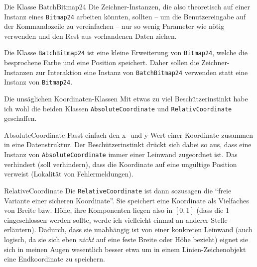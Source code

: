 \begin{frame}[fragile]{Die Klasse BatchBitmap24}
	Die Zeichner-Instanzen, die also theoretisch auf einer Instanz eines \verb|Bitmap24| arbeiten könnten, sollten -- um die Benutzereingabe auf der Kommandozeile zu vereinfachen -- nur so wenig Parameter wie nötig verwenden und den Rest aus vorhandenen Daten ziehen.
	
	\pause
	\vspace{1em}
	
	Die Klasse \verb|BatchBitmap24| ist eine kleine Erweiterung von \verb|Bitmap24|, welche die besprochene Farbe und eine Position speichert. Daher sollen die Zeichner-Instanzen zur Interaktion eine Instanz von \verb|BatchBitmap24| verwenden statt eine Instanz von \verb|Bitmap24|.
\end{frame}

\begin{frame}[fragile]{Die unsäglichen Koordinaten-Klassen}
	Mit etwas zu viel Beschützerinstinkt habe ich wohl die beiden Klassen \verb|AbsoluteCoordinate| und \verb|RelativCoordinate| geschaffen.
	
	\pause
	\footnotesize
	
	\begin{block}{AbsoluteCoordinate}
		Fasst einfach den x- und y-Wert einer Koordinate zusammen in eine Datenstruktur. Der Beschützerinstinkt drückt sich dabei so aus, dass eine Instanz von \verb|AbsoluteCoordinate| immer einer Leinwand zugeordnet ist. Das verhindert (soll verhindern), dass die Koordinate auf eine ungültige Position verweist (Lokalität von Fehlermeldungen).
	\end{block}
	
	\pause
	
	\begin{block}{RelativeCoordinate}
		Die \verb|RelativeCoordinate| ist dann sozusagen die \enquote{freie Variante einer sicheren Koordinate}. Sie speichert eine Koordinate als Vielfaches von Breite bzw. Höhe, ihre Komponenten liegen also in $[0, 1]$ (dass die 1 eingeschlossen werden sollte, werde ich vielleicht einmal an anderer Stelle erläutern).
		Dadurch, dass sie unabhängig ist von einer konkreten Leinwand (auch logisch, da sie sich eben \emph{nicht} auf eine feste Breite oder Höhe bezieht) eignet sie sich in meinen Augen wesentlich besser etwa um in einem Linien-Zeichenobjekt eine Endkoordinate zu speichern.
	\end{block}
\end{frame}

